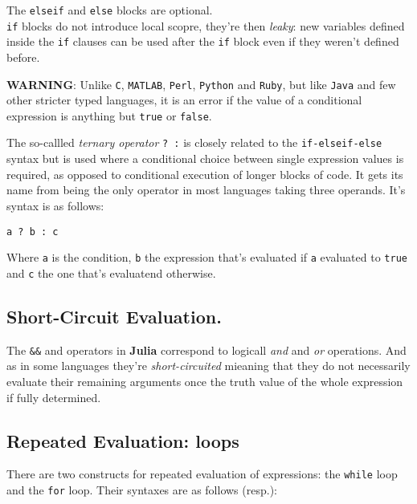 \documentclass[
]{article}
\begin{document}
The \texttt{elseif} and \texttt{else} blocks are optional.\\
\texttt{if} blocks do not introduce local scopre, they're then
\emph{leaky}: new variables defined inside the \texttt{if} clauses can
be used after the \texttt{if} block even if they weren't defined before.

\textbf{WARNING}: Unlike \texttt{C}, \texttt{MATLAB}, \texttt{Perl},
\texttt{Python} and \texttt{Ruby}, but like \texttt{Java} and few other
stricter typed languages, it is an error if the value of a conditional
expression is anything but \texttt{true} or \texttt{false}.

The so-callled \emph{ternary operator} \texttt{?\ :} is closely related
to the \texttt{if-elseif-else} syntax but is used where a conditional
choice between single expression values is required, as opposed to
conditional execution of longer blocks of code. It gets its name from
being the only operator in most languages taking three operands. It's
syntax is as follows:

\begin{verbatim}
a ? b : c
\end{verbatim}

Where \texttt{a} is the condition, \texttt{b} the expression that's
evaluated if \texttt{a} evaluated to \texttt{true} and \texttt{c} the
one that's evaluatend otherwise.

\hypertarget{short-circuit-evaluation.}{%
\subsection{\texorpdfstring{\textbf{Short-Circuit
Evaluation}.}{Short-Circuit Evaluation.}}\label{short-circuit-evaluation.}}

The \texttt{\&\&} and \texttt{\textbar{}\textbar{}} operators in
\textbf{Julia} correspond to logicall \emph{and} and \emph{or}
operations. And as in some languages they're \emph{short-circuited}
mieaning that they do not necessarily evaluate their remaining arguments
once the truth value of the whole expression if fully determined.

\hypertarget{repeated-evaluation-loops}{%
\subsection{\texorpdfstring{\textbf{Repeated Evaluation:
loops}}{Repeated Evaluation: loops}}\label{repeated-evaluation-loops}}

There are two constructs for repeated evaluation of expressions: the
\texttt{while} loop and the \texttt{for} loop. Their syntaxes are as
follows (resp.):
\end{document}
